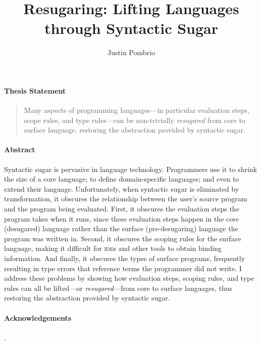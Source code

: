 \documentclass[
  10pt,
  paper=letter,
  footinclude=true,
  headinclude=true,
  american
]{scrbook}
\newcommand{\Sc}[1]{\textsc{#1}}
\renewcommand{\<}{\le}
\begin{document}

\author{Justin Pombrio}
\title{Resugaring: Lifting Languages through Syntactic Sugar}
\maketitle

\paragraph{Thesis Statement}
\begin{quote}
Many aspects of programming languages---in particular evaluation
steps, scope rules, and type rules---can be non-trivially
\emph{resugared} from core to surface language, restoring the
abstraction provided by syntactic sugar.
\end{quote}

\paragraph{Abstract}
Syntactic sugar is pervasive in language technology. Programmers use
it to shrink the size of a core language; to define domain-specific
languages; and even to extend their language. Unfortunately, when
syntactic sugar is eliminated by transformation, it obscures the
relationship between the user's source program and the program being
evaluated.  First, it obscures the evaluation steps the program takes
when it runs, since these evaluation steps happen in the core
(desugared) language rather than the surface (pre-desugaring) language
the program was written in.  Second, it obscures the scoping
rules for the surface language, making it difficult for \Sc{ide}s and
other tools to obtain binding information.  And finally, it obscures the types of
surface programs, frequently resulting in type errors that reference
terms the programmer did not write.  I address
these problems by showing how evaluation steps, scoping rules, and
type rules can all be lifted---or \emph{resugared}---from core to surface
languages, thus restoring the abstraction provided by syntactic
sugar.

\tableofcontents



\paragraph{Acknowledgements}. %
\end{document}
